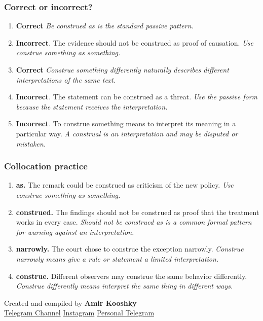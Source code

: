 \documentclass[11pt]{article}
\begin{document}
\subsubsection{Correct or incorrect?}
\begin{enumerate}
  \item \textbf{Correct} \emph{Be construed as is the standard passive pattern.}
  \item \textbf{Incorrect}. The evidence should not be construed as proof of causation. \emph{Use construe something as something.}
  \item \textbf{Correct} \emph{Construe something differently naturally describes different interpretations of the same text.}
  \item \textbf{Incorrect}. The statement can be construed as a threat. \emph{Use the passive form because the statement receives the interpretation.}
  \item \textbf{Incorrect}. To construe something means to interpret its meaning in a particular way. \emph{A construal is an interpretation and may be disputed or mistaken.}
\end{enumerate}

\subsubsection{Collocation practice}
\begin{enumerate}
  \item \textbf{as.} The remark could be construed as criticism of the new policy. \emph{Use construe something as something.}
  \item \textbf{construed.} The findings should not be construed as proof that the treatment works in every case. \emph{Should not be construed as is a common formal pattern for warning against an interpretation.}
  \item \textbf{narrowly.} The court chose to construe the exception narrowly. \emph{Construe narrowly means give a rule or statement a limited interpretation.}
  \item \textbf{construe.} Different observers may construe the same behavior differently. \emph{Construe differently means interpret the same thing in different ways.}
\end{enumerate}

\vfill
\begin{center}
\small\color{Muted} Created and compiled by \textbf{Amir Kooshky}\\
\href{https://t.me/KooshkyTOEFL}{Telegram Channel}\quad\textbullet\quad
\href{https://www.instagram.com/kooshkytoefl}{Instagram}\quad\textbullet\quad
\href{https://t.me/KooshkyTOEFL\_pv}{Personal Telegram}
\end{center}
\end{document}

